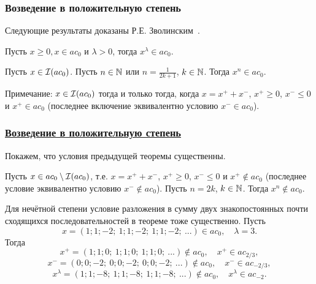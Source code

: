\begin{frame}\frametitle{Возведение в положительную степень}
	Следующие результаты доказаны Р.Е. Зволинским~\cite{zvol2022ac}.

	\begin{ttheorem}
		\label{thm:Zvol_pow_pos}
		Пусть $x \geqslant 0, x \in a c_0$ и $\lambda>0$, тогда $x^\lambda \in a c_0$.
	\end{ttheorem}

	\begin{ttheorem}
		\label{thm:Zvol_pow_composed}
		Пусть $x\in \mathcal{I}(ac_0)$.
		Пусть $n\in\mathbb{N}$ или $n = \frac1{2k+1}$, $k\in\mathbb{N}$.
		Тогда $x^n \in ac_0$.
	\end{ttheorem}

	Примечание: $x\in \mathcal{I}(ac_0)$ тогда и только тогда, когда $x = x^+ +x^-$, $x^+\geq 0$, $x^- \leq 0$ и $x^+ \in ac_0$
	(последнее включение эквивалентно условию $x^- \in ac_0$).

\end{frame}



\begin{frame}\frametitle{\underline{Возведение в положительную степень}}
	Покажем, что условия предыдущей теоремы существенны.

	\begin{llemma}
		\label{thm:ac0_pow_even}
		Пусть $x\in ac_0 \setminus \mathcal{I}(ac_0)$, т.е. $x = x^+ +x^-$, $x^+\geq 0$, $x^- \leq 0$ и $x^+ \notin ac_0$
		(последнее условие эквивалентно условию $x^- \notin ac_0$).
		Пусть $n = 2k$, $k\in\mathbb{N}$.
		Тогда $x^n \notin ac_0$.
	\end{llemma}





	\begin{eexample}
		Для нечётной степени условие разложения в сумму двух знакопостоянных
		почти сходящихся последовательностей в теореме тоже существенно.
		Пусть
		\begin{equation}
			x = (1;1;-2;\ 1;1;-2;\ 1;1;-2;\ ...) \in ac_0
			,
			\quad
			\lambda = 3
			.
		\end{equation}
		Тогда
		\begin{equation}
			x^+ = (1;1;0;\ 1;1;0;\ 1;1;0;\ ...) \notin ac_0, \quad x^+ \in ac_{2/3}
			,
		\end{equation}
		\begin{equation}
			x^- = (0;0;-2;\ 0;0;-2;\ 0;0;-2;\ ...) \notin ac_0, \quad x^- \in ac_{-2/3}
			,
		\end{equation}
		\begin{equation}
			x^\lambda = (1;1;-8;\ 1;1;-8;\ 1;1;-8;\ ...) \notin ac_0, \quad x^\lambda \in ac_{-2}
			.
		\end{equation}
	\end{eexample}



\end{frame}



